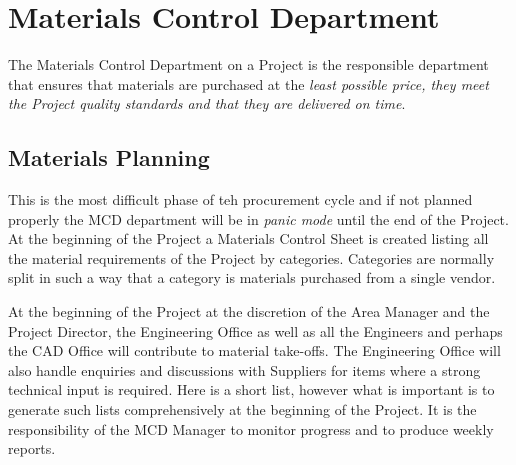 \def\inc{\addtocounter{inc}{1}\theinc}


\chapter{Materials Control Department}


The Materials Control Department on a Project is the responsible department that ensures that materials are purchased at the \textit{least possible price, they
meet the Project quality standards  and that they are delivered on time}. 

\section*{Materials Planning}
This is the most difficult phase of teh procurement cycle and if not planned
properly the MCD department will be in \textit{panic mode} until the end of the
Project. At the beginning of the Project a Materials Control Sheet is created
listing all the material requirements of the Project by categories. Categories
are normally split in such a way that a category is materials purchased from a single
vendor.

At the beginning of the Project at the discretion of the Area Manager and the Project
Director, the Engineering Office as well as all the Engineers and perhaps the
CAD Office will contribute to material take-offs. The Engineering Office
will also handle enquiries and discussions with Suppliers for items where
a strong technical input is required. Here is a short list, however what is important
is to generate such lists comprehensively at the beginning of the Project. It is the 
responsibility of the MCD Manager to monitor progress and to produce weekly reports.

